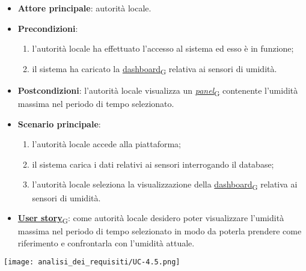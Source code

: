 \begin{itemize}
	\item \textbf{Attore principale}: autorità locale.
	\item \textbf{Precondizioni}:
	      \begin{enumerate}
		      \item l'autorità locale ha effettuato l'accesso al sistema ed esso è in funzione;
		      \item il sistema ha caricato la \href{https://7last.github.io/docs/pb/documentazione-interna/glossario\#dashboard}{dashboard\textsubscript{G}} relativa ai sensori di umidità.
	      \end{enumerate}
	\item \textbf{Postcondizioni}: l'autorità locale visualizza un \href{https://7last.github.io/docs/pb/documentazione-interna/glossario\#panel}{\textit{panel}\textsubscript{G}} contenente l'umidità massima nel periodo di tempo selezionato.
	\item \textbf{Scenario principale}:
	      \begin{enumerate}
		      \item l'autorità locale accede alla piattaforma;
		      \item il sistema carica i dati relativi ai sensori interrogando il database;
		      \item l'autorità locale seleziona la visualizzazione della \href{https://7last.github.io/docs/pb/documentazione-interna/glossario\#dashboard}{dashboard\textsubscript{G}} relativa ai sensori di umidità.
	      \end{enumerate}
	\item \href{https://7last.github.io/docs/pb/documentazione-interna/glossario\#user-story}{\textbf{User story}\textsubscript{G}}:
	      come autorità locale desidero poter visualizzare l'umidità massima nel periodo di tempo selezionato
	      in modo da poterla prendere come riferimento e confrontarla con l'umidità attuale.
\end{itemize}
\begin{center}
	\texttt{[image: analisi\_dei\_requisiti/UC-4.5.png]}
\end{center}


